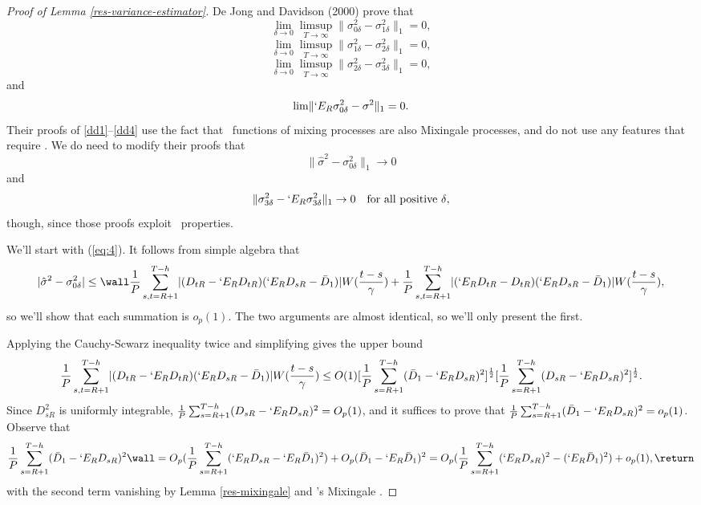 \documentclass[11pt]{article}
\newcommand{\E}{`E}
\newcommand{\citepos}[1]{\citeauthor{#1}'s \citeyearpar{#1}}
\newcommand{\oosSum}[2]{\ensuremath{\sum_{#1=R+#2}^{T-\h}}}
\newcommand{\h}{h}
\newcommand{\vWeight}{W(\frac{t-s}{\gamma})}
\newcommand{\varianceTermI}{\ensuremath{\sigma_{0\delta}^2}}
\newcommand{\varianceTermII}{\ensuremath{\sigma_{1\delta}^2}}
\newcommand{\varianceTermIII}{\ensuremath{\sigma_{2\delta}^{2}}}
\newcommand{\varianceTermIV}{\ensuremath{\sigma_{3\delta}^{2}}}
\newcommand{\varianceDiffA}{\ensuremath{\frac1{P} \oosSum{s,t}{1}
    \lvert (D_{tR} - \E_R D_{tR})(\E_R D_{sR} - \bar D_1) \rvert
\vWeight}}
\newcommand{\varianceDiffAi}{\ensuremath{\frac1P \oosSum{s}{1}(\bar
    D_1 - \E_R D_{sR})^2}}
\newcommand{\varianceDiffAii}{\ensuremath{\frac1P \oosSum{s}{1}
    (D_{sR} - \E_R D_{sR})^2}}
\begin{document}
\begin{proof}[Proof of Lemma \ref{res-variance-estimator}]
De Jong and Davidson (2000) prove that
\begin{equation} \label{dd1}
\lim_{\delta\to0} \limsup_{T\to\infty} \lVert \varianceTermI -
\varianceTermII\rVert_1 = 0,
\end{equation}
\begin{equation} \label{dd2}
\lim_{\delta\to0} \limsup_{T\to\infty} \lVert \varianceTermII - \varianceTermIII
\rVert_1 = 0,
\end{equation}
\begin{equation} \label{dd3}
\lim_{\delta\to0} \limsup_{T\to\infty} \lVert \varianceTermIII - \varianceTermIV
\rVert_1 = 0,  
\end{equation}
and
\begin{equation} \label{dd4}
\lim \lVert \E_R \varianceTermI - \sigma^2 \rVert_1 = 0.
\end{equation}
Their proofs of \eqref{dd1}--\eqref{dd4} use the fact that \ned\
functions of mixing processes are also Mixingale processes, and do not
use any features that require \ned.  We do need to modify
their proofs that
\begin{equation}
  \label{eq:4} \lVert \hat{\sigma}^2 - \varianceTermI \rVert_1 \to 0
\end{equation}
and
\begin{equation}
  \label{eq:5} \lVert \varianceTermIV - \E_R \varianceTermIV \rVert_1
  \to 0 \quad \text{for all positive $\delta$},
\end{equation}
though, since those proofs exploit \ned\ properties.

We'll start with (\ref{eq:4}). It follows from simple algebra that
\[
\lvert \hat\sigma^2 - \varianceTermI \rvert \leq \wall
\varianceDiffA \\ +
\frac1{P} \oosSum{s,t}{1} \lvert (\E_{R} D_{tR} - D_{tR})(\E_R D_{sR} - \bar D_1) \rvert
\vWeight,
\]
so we'll show that each summation is $o_p(1)$.  The two
arguments are almost identical, so we'll only present the first.

Applying the Cauchy-Scwarz inequality twice and simplifying gives the
upper bound
\[
\varianceDiffA \\ \leq O(1) [\varianceDiffAi]^{\frac12} [\varianceDiffAii]^{\frac12}.
\]
Since $D_{sR}^2$ is uniformly integrable, 
$\frac1P \oosSum{s}{1}(D_{sR} - \E_R D_{sR})^2 = O_p(1)$, and it suffices to prove
that $\varianceDiffAi = o_p(1)$.  Observe that
\[
\varianceDiffAi \wall =  O_p(\frac1P \oosSum{s}{1}(\E_{R}D_{sR} -
\E_R\bar D_1)^2)
+ O_p(\bar D_1 - \E_R\bar D_1)^{2} \\
= O_p(\frac1P \oosSum{s}{1} (\E_RD_{sR})^2 - (\E_R\bar D_1)^2) + o_p(1),    \return
\]
with the second term vanishing by Lemma \ref{res-mixingale} and
\citepos{davidson_l1-convergence_1993} Mixingale \lln.


\end{proof}
\end{document}
